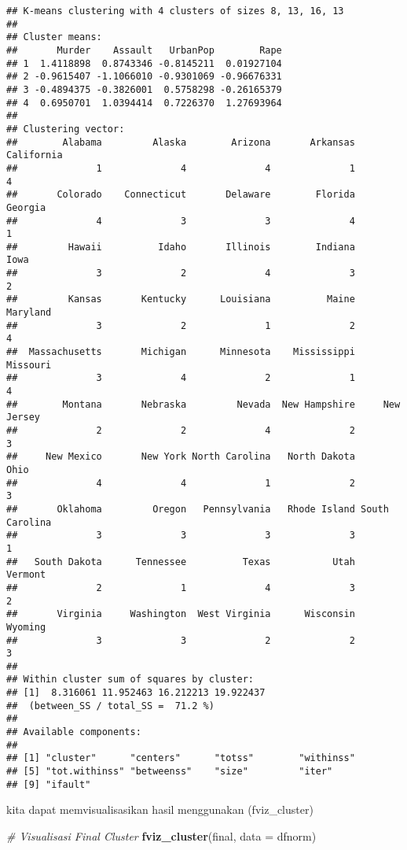 \documentclass[]{article}
\newenvironment{Shaded}{\begin{snugshade}}{\end{snugshade}}
\newcommand{\CommentTok}[1]{\textcolor[rgb]{0.56,0.35,0.01}{\textit{#1}}}
\newcommand{\DataTypeTok}[1]{\textcolor[rgb]{0.13,0.29,0.53}{#1}}
\newcommand{\KeywordTok}[1]{\textcolor[rgb]{0.13,0.29,0.53}{\textbf{#1}}}
\newcommand{\NormalTok}[1]{#1}
\begin{document}
\begin{verbatim}
## K-means clustering with 4 clusters of sizes 8, 13, 16, 13
## 
## Cluster means:
##       Murder    Assault   UrbanPop        Rape
## 1  1.4118898  0.8743346 -0.8145211  0.01927104
## 2 -0.9615407 -1.1066010 -0.9301069 -0.96676331
## 3 -0.4894375 -0.3826001  0.5758298 -0.26165379
## 4  0.6950701  1.0394414  0.7226370  1.27693964
## 
## Clustering vector:
##        Alabama         Alaska        Arizona       Arkansas     California 
##              1              4              4              1              4 
##       Colorado    Connecticut       Delaware        Florida        Georgia 
##              4              3              3              4              1 
##         Hawaii          Idaho       Illinois        Indiana           Iowa 
##              3              2              4              3              2 
##         Kansas       Kentucky      Louisiana          Maine       Maryland 
##              3              2              1              2              4 
##  Massachusetts       Michigan      Minnesota    Mississippi       Missouri 
##              3              4              2              1              4 
##        Montana       Nebraska         Nevada  New Hampshire     New Jersey 
##              2              2              4              2              3 
##     New Mexico       New York North Carolina   North Dakota           Ohio 
##              4              4              1              2              3 
##       Oklahoma         Oregon   Pennsylvania   Rhode Island South Carolina 
##              3              3              3              3              1 
##   South Dakota      Tennessee          Texas           Utah        Vermont 
##              2              1              4              3              2 
##       Virginia     Washington  West Virginia      Wisconsin        Wyoming 
##              3              3              2              2              3 
## 
## Within cluster sum of squares by cluster:
## [1]  8.316061 11.952463 16.212213 19.922437
##  (between_SS / total_SS =  71.2 %)
## 
## Available components:
## 
## [1] "cluster"      "centers"      "totss"        "withinss"    
## [5] "tot.withinss" "betweenss"    "size"         "iter"        
## [9] "ifault"
\end{verbatim}

kita dapat memvisualisasikan hasil menggunakan (fviz\_cluster)

\begin{Shaded}
\begin{Highlighting}[]
\CommentTok{# Visualisasi Final Cluster}
\KeywordTok{fviz_cluster}\NormalTok{(final, }\DataTypeTok{data =}\NormalTok{ dfnorm)}
\end{Highlighting}
\end{Shaded}
\end{document}
